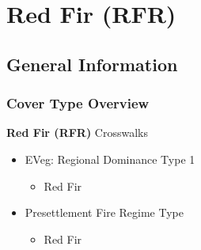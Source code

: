 \newpage
\section{Red Fir (RFR)}

\subsection*{General Information}

\subsubsection{Cover Type Overview}

\textbf{Red Fir (RFR)}
\newline
Crosswalks
\begin{itemize}
	\item EVeg: Regional Dominance Type 1
	\begin{itemize}
		\item Red Fir
	\end{itemize}

	\item Presettlement Fire Regime Type
	\begin{itemize}
		\item Red Fir
	\end{itemize}


\end{itemize}
